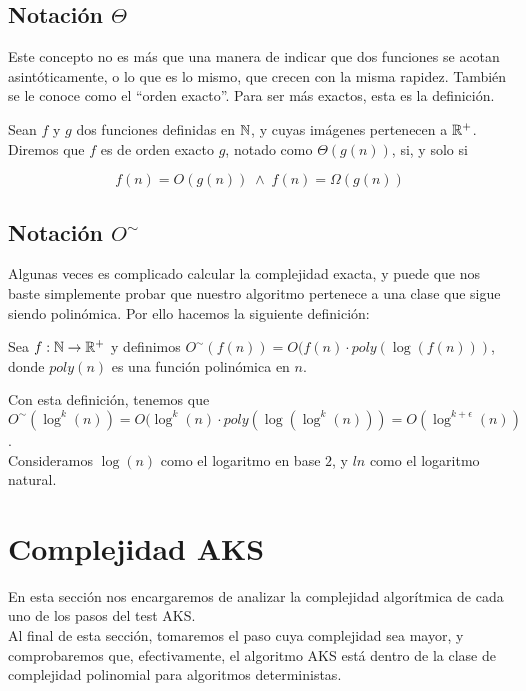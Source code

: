 \subsection{Notación $\Theta$}

Este concepto no es más que una manera de indicar que dos funciones se acotan asintóticamente, o lo que es lo mismo, que crecen con la misma rapidez. También se le conoce como el ``orden exacto''. Para ser más exactos, esta es la definición.

\begin{definicion}
	Sean $f$ y $g$ dos funciones definidas en $\mathbb{N}$, y cuyas imágenes pertenecen a $\mathbb{R}^+$. Diremos que $f$ es de orden exacto $g$, notado como $\Theta(g(n))$, si, y solo si
	
	$$f(n) = O(g(n))\;\wedge\;f(n) = \Omega(g(n))$$
\end{definicion}

\subsection{Notación $O^\sim$}

Algunas veces es complicado calcular la complejidad exacta, y puede que nos baste simplemente probar que nuestro algoritmo pertenece a una clase que sigue siendo polinómica. Por ello hacemos la siguiente definición:

\begin{definicion}
	Sea $f:\mathbb{N} \to \mathbb{R}^+$ y definimos $O^\sim(f(n)) = O(f(n) \cdot poly(\log(f(n)))$, donde $poly(n)$ es una función polinómica en $n$.
\end{definicion}

Con esta definición, tenemos que $O^\sim(\log^k(n)) = O(\log^k(n) \cdot poly(\log(\log^k(n))) = O(\log^{k+\epsilon}(n))$.\\

Consideramos $\log(n)$ como el logaritmo en base $2$, y $ln$ como el logaritmo natural.

\section{Complejidad AKS}

En esta sección nos encargaremos de analizar la complejidad algorítmica de cada uno de los pasos del test AKS.\\

Al final de esta sección, tomaremos el paso cuya complejidad sea mayor, y comprobaremos que, efectivamente, el algoritmo AKS está dentro de la clase de complejidad polinomial para algoritmos deterministas.

